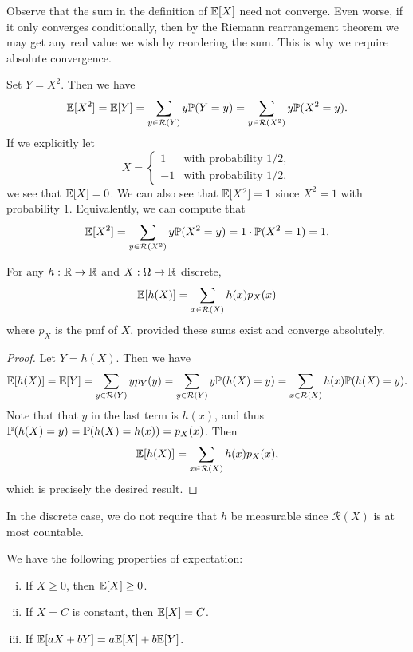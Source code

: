 \begin{remark}
  Observe that the sum in the definition of
  $\mathbb{E}[X]$ need not converge. Even worse, if it
  only converges conditionally, then by the Riemann
  rearrangement theorem we may get any real value
  we wish by reordering the sum. This is why we
  require absolute convergence.
\end{remark}

\begin{example}
  Set $Y = X^2$. Then we have
  \[
    \mathbb{E}[X^2] = \mathbb{E}[Y] = \sum_{y \in \mathcal{R}(Y)} y \mathbb{P}(Y = y)
    = \sum_{y \in \mathcal{R}(X^2)} y \mathbb{P}(X^2 = y).
  \]
  If we explicitly let
  \[
    X =
    \begin{cases}
      1 & \text{with probability } 1 / 2, \\
      -1 & \text{with probability } 1 / 2,
    \end{cases}
  \]
  we see that $\mathbb{E}[X] = 0$. We can also see that
  $\mathbb{E}[X^2] = 1$ since $X^2 = 1$ with probability $1$.
  Equivalently, we can compute that
  \[
    \mathbb{E}[X^2]
    = \sum_{y \in \mathcal{R}(X^2)} y \mathbb{P}(X^2 = y)
    = 1 \cdot \mathbb{P}(X^2 = 1) = 1.
  \]
\end{example}

\begin{prop}
  For any $h : \mathbb{R} \to \mathbb{R}$ and $X : \Omega \to \mathbb{R}$
  discrete,
  \[
    \mathbb{E}[h(X)] = \sum_{x \in \mathcal{R}(X)} h(x) p_X(x)
  \]
  where $p_X$ is the pmf of $X$, provided
  these sums exist and converge absolutely.
\end{prop}

\begin{proof}
  Let $Y = h(X)$. Then we have
  \[
    \mathbb{E}[h(X)] = \mathbb{E}[Y]
    = \sum_{y \in \mathcal{R}(Y)} y p_Y(y)
    = \sum_{y \in \mathcal{R}(Y)} y \mathbb{P}(h(X) = y)
    = \sum_{x \in \mathcal{R}(X)} h(x) \mathbb{P}(h(X) = y).
  \]
  Note that that $y$ in the last term is
  $h(x)$, and thus $\mathbb{P}(h(X) = y) = \mathbb{P}(h(X) = h(x)) = p_X(x)$.
  Then
  \[
    \mathbb{E}[h(X)] = \sum_{x \in \mathcal{R}(X)} h(x) p_X(x),
  \]
  which is precisely the desired result.
\end{proof}

\begin{remark}
  In the discrete case, we do not require
  that $h$ be measurable
  since $\mathcal{R}(X)$ is at most countable.
\end{remark}

\begin{prop}
  We have the following properties of expectation:
  \begin{enumerate}[(i)]
    \item If $X \ge 0$, then $\mathbb{E}[X] \ge 0$.
    \item If $X = C$ is constant, then
      $\mathbb{E}[X] = C$.
    \item If $\mathbb{E}[aX + bY] = a\mathbb{E}[X] + b\mathbb{E}[Y]$.
  \end{enumerate}
\end{prop}

